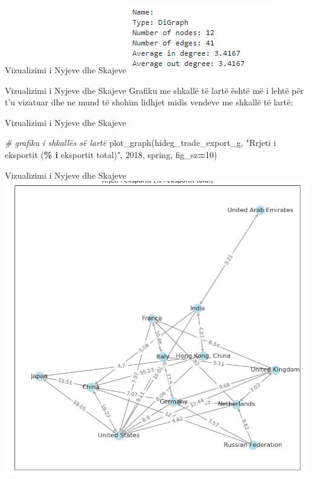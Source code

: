 \documentclass[
  ignorenonframetext,
]{beamer}
\newenvironment{Shaded}{\begin{snugshade}}{\end{snugshade}}
\newcommand{\CommentTok}[1]{\textcolor[rgb]{0.56,0.35,0.01}{\textit{#1}}}
\newcommand{\DecValTok}[1]{\textcolor[rgb]{0.00,0.00,0.81}{#1}}
\newcommand{\NormalTok}[1]{#1}
\newcommand{\OperatorTok}[1]{\textcolor[rgb]{0.81,0.36,0.00}{\textbf{#1}}}
\newcommand{\SpecialCharTok}[1]{\textcolor[rgb]{0.81,0.36,0.00}{\textbf{#1}}}
\newcommand{\StringTok}[1]{\textcolor[rgb]{0.31,0.60,0.02}{#1}}
\begin{document}
\begin{frame}{Vizualizimi i Nyjeve dhe Skajeve}
\protect\hypertarget{vizualizimi-i-nyjeve-dhe-skajeve-5}{}
\includegraphics{./Figs/difrrjet1.png}
\end{frame}

\begin{frame}{Vizualizimi i Nyjeve dhe Skajeve}
\protect\hypertarget{vizualizimi-i-nyjeve-dhe-skajeve-6}{}
Grafiku me shkallë të lartë është më i lehtë për t'u vizatuar dhe ne
mund të shohim lidhjet midis vendeve me shkallë të lartë:
\end{frame}

\begin{frame}[fragile]{Vizualizimi i Nyjeve dhe Skajeve}
\protect\hypertarget{vizualizimi-i-nyjeve-dhe-skajeve-7}{}

\begin{Shaded}
\begin{Highlighting}[]
\CommentTok{\# grafiku i shkallës së lartë}
\NormalTok{plot\_graph(hideg\_trade\_export\_g, }\StringTok{"Rrjeti i eksportit (}\SpecialCharTok{\% i}\StringTok{ eksportit total)"}\NormalTok{, }\StringTok{\textquotesingle{}2018\textquotesingle{}}\NormalTok{, }\StringTok{\textquotesingle{}spring\textquotesingle{}}\NormalTok{, fig\_sz}\OperatorTok{=}\DecValTok{10}\NormalTok{)}
\end{Highlighting}
\end{Shaded}
\end{frame}

\begin{frame}{Vizualizimi i Nyjeve dhe Skajeve}
\protect\hypertarget{vizualizimi-i-nyjeve-dhe-skajeve-8}{}
\includegraphics{./Figs/difrrjet2.png}
\end{frame}
\end{document}
